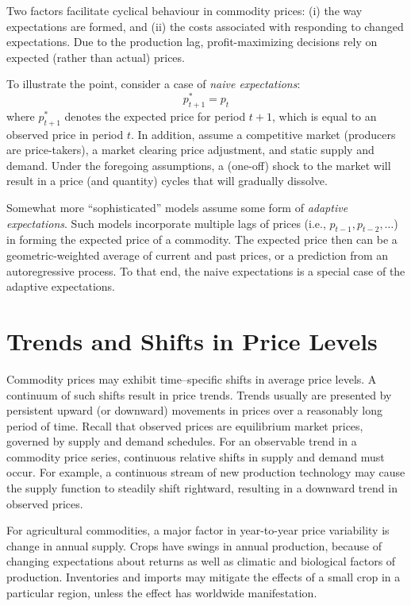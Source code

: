 \documentclass[
  oneside]{book}
\begin{document}
Two factors facilitate cyclical behaviour in commodity prices: (i) the way expectations are formed, and (ii) the costs associated with responding to changed expectations. Due to the production lag, profit-maximizing decisions rely on expected (rather than actual) prices.

To illustrate the point, consider a case of \emph{naive expectations}: \[p_{t+1}^{*} = p_{t}\] where \(p_{t+1}^{*}\) denotes the expected price for period \(t+1\), which is equal to an observed price in period \(t\). In addition, assume a competitive market (producers are price-takers), a market clearing price adjustment, and static supply and demand. Under the foregoing assumptions, a (one-off) shock to the market will result in a price (and quantity) cycles that will gradually dissolve.

Somewhat more ``sophisticated'' models assume some form of \emph{adaptive expectations}. Such models incorporate multiple lags of prices (i.e., \(p_{t-1},p_{t-2},\dots\)) in forming the expected price of a commodity. The expected price then can be a geometric-weighted average of current and past prices, or a prediction from an autoregressive process. To that end, the naive expectations is a special case of the adaptive expectations.

\hypertarget{trends-and-shifts-in-price-levels}{%
\section{Trends and Shifts in Price Levels}\label{trends-and-shifts-in-price-levels}}

Commodity prices may exhibit time--specific shifts in average price levels. A continuum of such shifts result in price trends. Trends usually are presented by persistent upward (or downward) movements in prices over a reasonably long period of time. Recall that observed prices are equilibrium market prices, governed by supply and demand schedules. For an observable trend in a commodity price series, continuous relative shifts in supply and demand must occur. For example, a continuous stream of new production technology may cause the supply function to steadily shift rightward, resulting in a downward trend in observed prices.

For agricultural commodities, a major factor in year-to-year price variability is change in annual supply. Crops have swings in annual production, because of changing expectations about returns as well as climatic and biological factors of production. Inventories and imports may mitigate the effects of a small crop in a particular region, unless the effect has worldwide manifestation.
\end{document}
